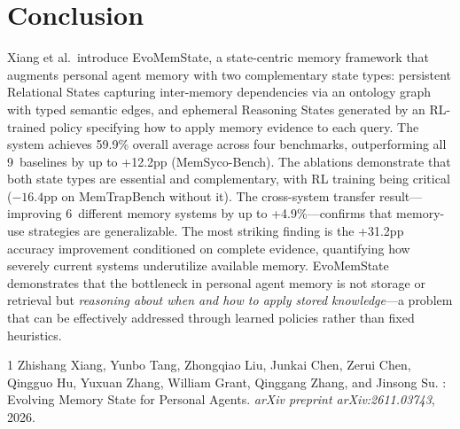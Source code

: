 \documentclass[11pt,a4paper]{article}
\begin{document}
\section{Conclusion}
Xiang et al.\ introduce EvoMemState, a state-centric memory framework that augments personal agent memory with two complementary state types: persistent Relational States capturing inter-memory dependencies via an ontology graph with typed semantic edges, and ephemeral Reasoning States generated by an RL-trained policy specifying how to apply memory evidence to each query. The system achieves 59.9\% overall average across four benchmarks, outperforming all 9~baselines by up to +12.2pp (MemSyco-Bench). The ablations demonstrate that both state types are essential and complementary, with RL training being critical ($-16.4$pp on MemTrapBench without it). The cross-system transfer result---improving 6~different memory systems by up to +4.9\%---confirms that memory-use strategies are generalizable. The most striking finding is the +31.2pp accuracy improvement conditioned on complete evidence, quantifying how severely current systems underutilize available memory. EvoMemState demonstrates that the bottleneck in personal agent memory is not storage or retrieval but \emph{reasoning about when and how to apply stored knowledge}---a problem that can be effectively addressed through learned policies rather than fixed heuristics.


\begin{thebibliography}{1}
Zhishang Xiang, Yunbo Tang, Zhongqiao Liu, Junkai Chen, Zerui Chen, Qingguo Hu, Yuxuan Zhang, William Grant, Qinggang Zhang, and Jinsong Su.
: Evolving Memory State for Personal Agents.
\newblock \emph{arXiv preprint arXiv:2611.03743}, 2026.
\end{thebibliography}
\end{document}
